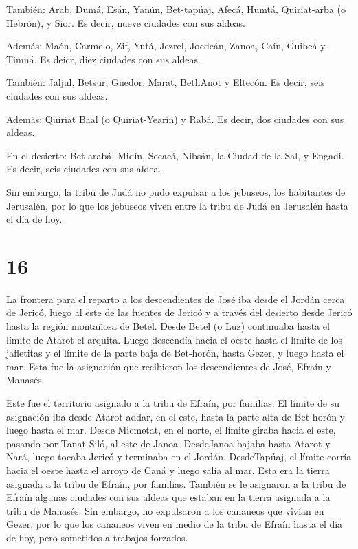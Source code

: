  También: Arab, Dumá, Esán,  Yanún,
Bet-tapúaj, Afecá,  Humtá, Quiriat-arba (o Hebrón), y Sior.
Es decir, nueve ciudades con sus aldeas.

 Además: Maón, Carmelo, Zif, Yutá,  Jezrel,
Jocdeán, Zanoa,  Caín, Guibeá y Timná. Es deicr, diez
ciudades con sus aldeas.

 También: Jaljul, Betsur, Guedor,  Marat,
BethAnot y Eltecón. Es decir, seis ciudades con sus aldeas.

 Además: Quiriat Baal (o Quiriat-Yearín) y Rabá. Es decir,
dos ciudades con sus aldeas.

 En el desierto: Bet-arabá, Midín, Secacá, 
Nibsán, la Ciudad de la Sal, y Engadi. Es decir, seis ciudades con sus
aldea.

 Sin embargo, la tribu de Judá no pudo expulsar a los
jebuseos, los habitantes de Jerusalén, por lo que los jebuseos viven
entre la tribu de Judá en Jerusalén hasta el día de hoy.

\hypertarget{section-15}{%
\section{16}\label{section-15}}

 La frontera para el reparto a los descendientes de José iba
desde el Jordán cerca de Jericó, luego al este de las fuentes de Jericó
y a través del desierto desde Jericó hasta la región montañosa de Betel.
 Desde Betel (o Luz) continuaba hasta el límite de Atarot el
arquita.  Luego descendía hacia el oeste hasta el límite de
los jafletitas y el límite de la parte baja de Bet-horón, hasta Gezer, y
luego hasta el mar.  Esta fue la asignación que recibieron
los descendientes de José, Efraín y Manasés.

 Este fue el territorio asignado a la tribu de Efraín, por
familias. El límite de su asignación iba desde Atarot-addar, en el este,
hasta la parte alta de Bet-horón  y luego hasta el mar.
Desde Micmetat, en el norte, el límite giraba hacia el este, pasando por
Tanat-Siló, al este de Janoa.  DesdeJanoa bajaba hasta
Atarot y Nará, luego tocaba Jericó y terminaba en el Jordán.
 DesdeTapúaj, el límite corría hacia el oeste hasta el
arroyo de Caná y luego salía al mar. Esta era la tierra asignada a la
tribu de Efraín, por familias.  También se le asignaron a la
tribu de Efraín algunas ciudades con sus aldeas que estaban en la tierra
asignada a la tribu de Manasés.  Sin embargo, no expulsaron
a los cananeos que vivían en Gezer, por lo que los cananeos viven en
medio de la tribu de Efraín hasta el día de hoy, pero sometidos a
trabajos forzados.

